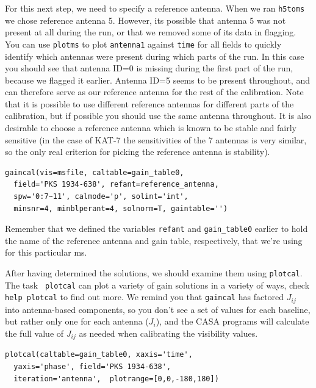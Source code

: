 \documentclass[force,almostfull,justified]{tufte-book}
\begin{document}
For this next step, we need to specify a reference antenna.  When we ran {\tt h5toms} we chose
reference antenna 5.  However, its possible that antenna 5 was not present at all during the run, or
that we removed some of its data in flagging.  You can use {\tt plotms} to plot {\tt antenna1} against
{\tt time} for all fields to quickly identify which antennas were present during which parts of the
run.  In this case you should see that antenna ID=0 is missing during the first part of the run,
because we flagged it earlier.  Antenna ID=5 seems to be present throughout, and can therefore serve
as our reference antenna for the rest of the calibration.  Note that it is possible to use different
reference antennas for different parts of the calibration, but if possible you should use the same
antenna throughout.  It is also desirable to choose a reference antenna which is known to be stable
and fairly sensitive (in the case of KAT-7 the sensitivities of the 7 antennas is very similar, so the
only real criterion for picking the reference antenna is stability).

\begin{casacmd}
\begin{verbatim}
gaincal(vis=msfile, caltable=gain_table0,
  field='PKS 1934-638', refant=reference_antenna,
  spw='0:7~11', calmode='p', solint='int',
  minsnr=4, minblperant=4, solnorm=T, gaintable='')
\end{verbatim}
Remember that we defined the variables {\tt refant} and {\tt gain\_table0} earlier to hold the name of
the reference antenna and gain table, respectively, that we're using for this particular ms.
\end{casacmd}

After having determined the solutions, we should examine them using {\tt plotcal}. The task {\tt
plotcal} can plot a variety of gain solutions in a variety of ways, check {\tt help plotcal} to find
out more.  We remind you that {\tt gaincal} has factored $J_{ij}$ into antenna-based components, so
you don't see a set of values for each baseline, but rather only one for each antenna ($J_i$), and the
CASA programs will calculate the full value of $J_{ij}$ as needed when calibrating the visibility
values.

\begin{casacmd}
\begin{verbatim}
plotcal(caltable=gain_table0, xaxis='time',
  yaxis='phase', field='PKS 1934-638',
  iteration='antenna',  plotrange=[0,0,-180,180])
\end{verbatim}
\end{casacmd}
\end{document}
